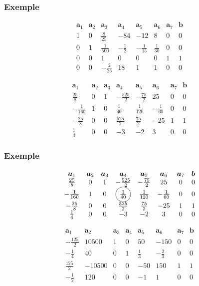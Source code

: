\documentclass[t,usepdftitle=false]{beamer}
\newcommand*\circled[1]{\tikz[baseline=(char.base)]{
    \node[shape=circle,draw,inner sep=2pt] (char) {#1};}}
\def\ba{\boldsymbol{a}}
\def\bb{\boldsymbol{b}}
\begin{document}
\begin{frame}
	\frametitle{Exemple}
	
	\[
	\begin{matrix}
		\ba_1 & \ba_2 & \ba_3 & \ba_4 & \ba_5 &\ba_6 &\ba_7 & \bb \\
		1 & 0 & \frac{8}{25} & -84 & -12 & 8 & 0 & 0 \\
		0 & 1 & \frac{1}{500} & -\frac{1}{2} & -\frac{1}{15} & \frac{1}{30} & 0 & 0 \\
		0 & 0 & 1 & 0 & 0 & 0 & 1 & 1 \\
		0 & 0 & -\frac{2}{25} & 18 & 1 & 1 & 0 & 0
	\end{matrix}
	\]
	
	\[
	\begin{matrix}
		\ba_1 & \ba_2 & \ba_3 & \ba_4 & \ba_5 &\ba_6 &\ba_7 & \bb \\
		\frac{25}{8} & 0 & 1 & -\frac{525}{2} & -\frac{75}{2} & 25 & 0 & 0 \\
		-\frac{1}{160} & 1 & 0 & \frac{1}{40} & \frac{1}{120} & -\frac{1}{60} & 0 & 0 \\
		-\frac{25}{8} & 0 & 0 & \frac{525}{2} & \frac{75}{2} & -25 & 1 & 1 \\
		\frac{1}{4} & 0 & 0 & -3 & -2 & 3 & 0 & 0
	\end{matrix}
	\]
	
\end{frame}

\begin{frame}
	\frametitle{Exemple}
	
	\[
	\begin{matrix}
		\ba_1 & \ba_2 & \ba_3 & \ba_4 & \ba_5 &\ba_6 &\ba_7 & \bb \\
		\frac{25}{8} & 0 & 1 & -\frac{525}{2} & -\frac{75}{2} & 25 & 0 & 0 \\
		-\frac{1}{160} & 1 & 0 & \circled{$\frac{1}{40}$} & \frac{1}{120} & -\frac{1}{60} & 0 & 0 \\
		-\frac{25}{8} & 0 & 0 & \frac{525}{2} & \frac{75}{2} & -25 & 1 & 1 \\
		\frac{1}{4} & 0 & 0 & -3 & -2 & 3 & 0 & 0
	\end{matrix}
	\]
	
	\[
	\begin{matrix}
		\ba_1 & \ba_2 & \ba_3 & \ba_4 & \ba_5 &\ba_6 &\ba_7 & \bb \\
		-\frac{125}{2} & 10500 & 1 & 0 & 50 & -150 & 0 & 0 \\
		-\frac{1}{4} & 40 & 0 & 1 & \frac{1}{3} & -\frac{2}{3} & 0 & 0 \\
		\frac{125}{2} & -10500 & 0 & 0 & -50 & 150 & 1 & 1 \\
		-\frac{1}{2} & 120 & 0 & 0 & -1 & 1 & 0 & 0
	\end{matrix}
	\]
	
\end{frame}
\end{document}
